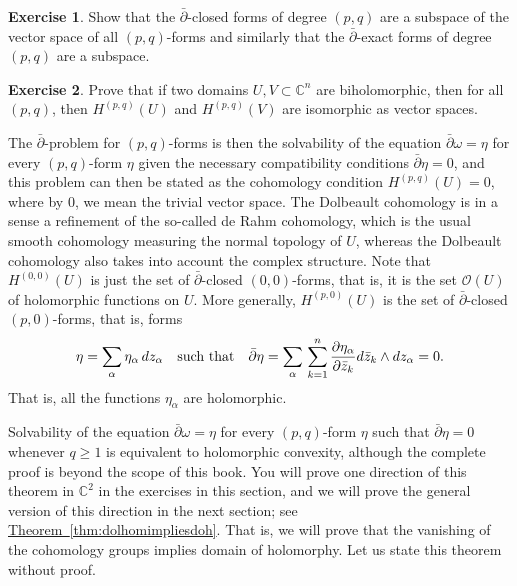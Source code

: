 \documentclass[12pt,openany]{book}
\newcommand{\avoidbreak}{\postdisplaypenalty=100}
\newcommand{\C}{{\mathbb{C}}}
\newcommand{\sO}{{\mathscr{O}}}
\theoremstyle{plain}
\theoremstyle{remark}
\theoremstyle{definition}
\newenvironment{exbox}{%
    \def\FrameCommand{\vrule width 1pt \relax\hspace{10pt}}%
    \MakeFramed{\advance\hsize-\width\FrameRestore}%
}{%
    \endMakeFramed
}
\theoremstyle{exercise}
\newtheorem{exercise}{Exercise}[section]
\theoremstyle{example}
\newcommand{\thmref}[1]{\hyperref[#1]{Theorem~\ref*{#1}}}
\begin{document}
\begin{exbox}
\begin{exercise}
Show that the $\bar{\partial}$-closed forms of degree $(p,q)$
are a subspace of the vector space of all $(p,q)$-forms and similarly
that the
$\bar{\partial}$-exact forms of degree $(p,q)$
are a subspace.
\end{exercise}

\begin{exercise}
Prove that if two domains $U,V \subset \C^n$ are biholomorphic,
then for all $(p,q)$, then $H^{(p,q)}(U)$ and $H^{(p,q)}(V)$
are isomorphic as vector spaces.
\end{exercise}
\end{exbox}

The $\bar{\partial}$-problem for $(p,q)$-forms is then the solvability
of the equation $\bar{\partial} \omega = \eta$ for every $(p,q)$-form
$\eta$ given the necessary
compatibility conditions $\bar{\partial} \eta = 0$, and this problem
can then be stated as the cohomology condition $H^{(p,q)}(U) = 0$,
where by $0$, we mean the trivial vector space.
The Dolbeault cohomology is in a sense a refinement
of the so-called de Rahm cohomology,
which is the usual smooth cohomology measuring the normal topology of $U$,
whereas the Dolbeault cohomology also takes into account the complex structure.
Note that $H^{(0,0)}(U)$ is just the set of $\bar{\partial}$-closed
$(0,0)$-forms, that is, it is the set $\sO(U)$ of holomorphic functions on $U$.
More generally, $H^{(p,0)}(U)$ is the set of $\bar{\partial}$-closed
$(p,0)$-forms, that is, forms
\begin{equation*}
\eta =
\sum_{\alpha}
\eta_{\alpha} \, dz_\alpha
\quad \text{such that}
\quad
\bar{\partial} \eta
=
\sum_{\alpha}
\,
\sum_{k=1}^n
\frac{\partial \eta_{\alpha}}{\partial \bar{z}_k} d\bar{z}_k \wedge
dz_\alpha = 0.
\avoidbreak
\end{equation*}
That is, all the functions $\eta_{\alpha}$ are holomorphic.

Solvability of the equation $\bar{\partial} \omega = \eta$ for every $(p,q)$-form
$\eta$ such that $\bar{\partial} \eta = 0$ whenever $q \geq 1$
is equivalent to holomorphic convexity, although
the complete proof is beyond the scope of this book.  You will prove
one direction of this theorem in $\C^2$ in the exercises in this section,
and we will prove the general version of this direction in the next section;
see \thmref{thm:dolhomimpliesdoh}.  That is, we will prove that
the vanishing of the cohomology groups implies domain of holomorphy.
Let us state this theorem without proof.
\end{document}
